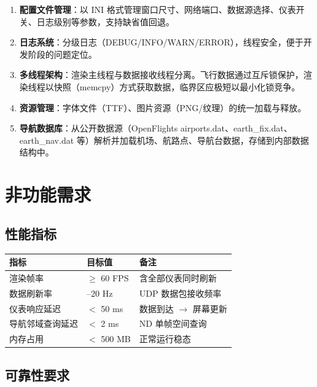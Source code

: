 \documentclass[12pt,a4paper]{ctexart}
\begin{document}
\begin{enumerate}[leftmargin=*]
    \item \textbf{配置文件管理}：以 INI 格式管理窗口尺寸、网络端口、数据源选择、仪表开关、日志级别等参数，支持缺省值回退。
    \item \textbf{日志系统}：分级日志（DEBUG/INFO/WARN/ERROR），线程安全，便于开发阶段的问题定位。
    \item \textbf{多线程架构}：渲染主线程与数据接收线程分离。飞行数据通过互斥锁保护，渲染线程以快照（memcpy）方式获取数据，临界区应极短以最小化锁竞争。
    \item \textbf{资源管理}：字体文件（TTF）、图片资源（PNG/纹理）的统一加载与释放。
    \item \textbf{导航数据库}：从公开数据源（OpenFlights airports.dat、earth\_fix.dat、earth\_nav.dat 等）解析并加载机场、航路点、导航台数据，存储到内部数据结构中。
\end{enumerate}

\section{非功能需求}


\subsection{性能指标}

\begin{table}[H]
\centering
\begin{tabular}{>{\raggedright\arraybackslash}p{5cm} >{\raggedright\arraybackslash}p{4cm} >{\raggedright\arraybackslash}p{5cm}}
\toprule
\textbf{指标} & \textbf{目标值} & \textbf{备注} \\
\midrule
渲染帧率 & $\geq$ 60 FPS & 含全部仪表同时刷新 \\
数据刷新率 & 10--20 Hz & UDP 数据包接收频率 \\
仪表响应延迟 & $<$ 50 ms & 数据到达 $\rightarrow$ 屏幕更新 \\
导航邻域查询延迟 & $<$ 2 ms & ND 单帧空间查询 \\
内存占用 & $<$ 500 MB & 正常运行稳态 \\
\bottomrule
\end{tabular}
\end{table}

\subsection{可靠性要求}
\end{document}
